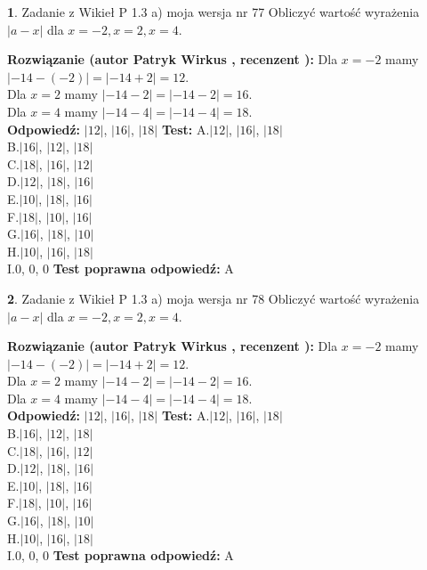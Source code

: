 \documentclass[12pt, a4paper]{article}
\theoremstyle{definition} %
\newtheorem{zad}{}
\newcommand{\zadStart}[1]{\begin{zad}#1\newline}
\newcommand{\zadStop}{\end{zad}}
\newcommand{\rozwStart}[2]{\noindent \textbf{Rozwiązanie (autor #1 , recenzent #2): }\newline}
\newcommand{\rozwStop}{\newline}
\newcommand{\odpStart}{\noindent \textbf{Odpowiedź:}\newline}
\newcommand{\odpStop}{\newline}
\newcommand{\testStart}{\noindent \textbf{Test:}\newline}
\newcommand{\testStop}{\newline}
\newcommand{\kluczStart}{\noindent \textbf{Test poprawna odpowiedź:}\newline}
\newcommand{\kluczStop}{\newline}
\begin{document}
\zadStart{Zadanie z Wikieł P 1.3 a) moja wersja nr 77}
Obliczyć wartość wyrażenia $|a - x|$ dla $x=-2,x=2,x=4$.
\zadStop
\rozwStart{Patryk Wirkus}{}
Dla $x = -2$ mamy $|-14 - (-2)| = |-14 + 2| = 12$.\\
Dla $x = 2$ mamy $|-14 - 2| = |-14 - 2| = 16$.\\
Dla $x = 4$ mamy $|-14 - 4| = |-14 - 4| = 18$.\\
\rozwStop
\odpStart
$|12|$, $|16|$, $|18|$
\odpStop
\testStart
A.$|12|$, $|16|$, $|18|$\\
B.$|16|$, $|12|$, $|18|$\\
C.$|18|$, $|16|$, $|12|$\\
D.$|12|$, $|18|$, $|16|$\\
E.$|10|$, $|18|$, $|16|$\\
F.$|18|$, $|10|$, $|16|$\\
G.$|16|$, $|18|$, $|10|$\\
H.$|10|$, $|16|$, $|18|$\\
I.$0$, $0$, $0$
\testStop
\kluczStart
A
\kluczStop



\zadStart{Zadanie z Wikieł P 1.3 a) moja wersja nr 78}
Obliczyć wartość wyrażenia $|a - x|$ dla $x=-2,x=2,x=4$.
\zadStop
\rozwStart{Patryk Wirkus}{}
Dla $x = -2$ mamy $|-14 - (-2)| = |-14 + 2| = 12$.\\
Dla $x = 2$ mamy $|-14 - 2| = |-14 - 2| = 16$.\\
Dla $x = 4$ mamy $|-14 - 4| = |-14 - 4| = 18$.\\
\rozwStop
\odpStart
$|12|$, $|16|$, $|18|$
\odpStop
\testStart
A.$|12|$, $|16|$, $|18|$\\
B.$|16|$, $|12|$, $|18|$\\
C.$|18|$, $|16|$, $|12|$\\
D.$|12|$, $|18|$, $|16|$\\
E.$|10|$, $|18|$, $|16|$\\
F.$|18|$, $|10|$, $|16|$\\
G.$|16|$, $|18|$, $|10|$\\
H.$|10|$, $|16|$, $|18|$\\
I.$0$, $0$, $0$
\testStop
\kluczStart
A
\kluczStop
\end{document}
